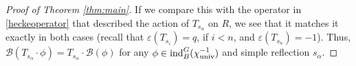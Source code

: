 \documentclass[11pt,letterpaper]{article}
\newcommand{\calH}{\mathcal{H}} %
\newcommand{\calB}{\mathcal{B}}
\newcommand{\ve}{\varepsilon}
\newcommand{\goth}{\mathfrak}
\newcommand{\GL}{\textup{GL}}
\newcommand{\ind}{\textup{ind}}
\theoremstyle{remark}
\numberwithin{equation}{section}
\begin{document}
\begin{proof}[Proof of Theorem \ref{thm:main}]

If we compare this with the operator in \eqref{heckeoperator} that described the action of $T_{s_{\alpha}}$ on $R$, we see that it matches it exactly in both cases (recall that $\ve(T_{s_i}) = q$, if $i<n$, and $\ve(T_{s_n}) = -1$). Thus, $\calB(T_{s_{\alpha}}\cdot \phi) = T_{s_{\alpha}}\cdot \calB(\phi)$ for any $\phi \in \ind_B^G(\chi_{\textup{univ}}^{-1})$ and simple reflection $s_{\alpha}$.
\end{proof}

\begin{comment}
Next, we need to calculate the intertwining constant $c_{s_1}(\chi)$. As mentioned above, calculating $c_{s_1}(\chi)$ will be somewhat similar to the calculation of the intertwining constant of the spherical functional in $\GL(2)$. In particular, unlike in the case above, it will be helpful to make a specific choice of function in $M(\chi)$ on which to calculate $\calB^{s_1\cdot \chi}\circ A_{s_1}$. 

Our plan is to calculate the value of the functional on the Iwahori-fixed vector $\varphi = \varphi_{w_0}^{\chi}$, and then show that this value is invariant under twisting by $s_1$, i.e.~that $\calB^{\chi}(\varphi^{\chi}) = \calB^{\chi^{s_1}}(\varphi^{\chi^{s_1}})$. If we can show this then we have that
\begin{align*}
\calB^{\chi^{s_1}}(A_{s_1}\varphi^{\chi}) &= \calB^{\chi^{s_1}}(c_{s_1}(\chi)\varphi^{\chi^{s_1}})
\\&= c_{s_1}(\chi)\calB^{\chi^{s_1}}(\varphi^{\chi^{s_1}})
\\&= c_{s_1}(\chi)\calB^{\chi}(\varphi^{\chi}).
\end{align*}

Our motivation for calculating the value of the functional at $\varphi$ comes, in part, from the definition of $Z_L$. We want to evaluate our functional at an Iwahori-fixed vector whose support is contained within $Bs_2s_1s_2U_PZ_L(\goth{o})$ and is also $Z_L(\goth{o})$-invariant on the right. With this in mind, an obvious choice of such a function would be $\varphi_{w_0}^{\chi} + \varphi_{s_2s_1s_2}^{\chi}$. Our motivation for picking an Iwahori-fixed vector in the first place is illuminated by the following lemma:


\end{comment}
\end{document}
